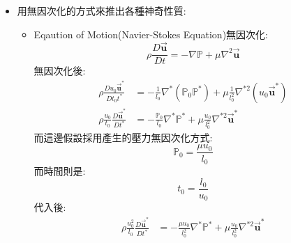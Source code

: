 \documentclass[../main.tex]{subfiles}
\begin{document}
\begin{itemize}
\begin{itemize}
    \begin{equation}
      \nabla^\ast = l_0 \cdot \nabla, \quad \nabla^{\ast 2} = l_0^2 \cdot \nabla^2
    \end{equation}
    會變成用乘的而不是除的，因為$\nabla^\ast$所代表的每個單位向量都被除了$l_0$\\
    可以想成你是對$\frac{\nabla}{l_0}$無因次化，所以你在找的$\nabla_0$是$\frac{1}{l_0}$
    \item 衍生，對$D/Dt$的無因次化\\
    P.S. $D$跟帶有單位的$\nabla$不一樣，只是個微分符號而已哦!
    \begin{equation}
      \frac{D}{D t^\ast} = \frac{D}{D\left(\frac{t}{t_0}\right)} = t_0 \cdot \frac{D}{Dt} = \left(\frac{l_0}{u_0}\right) \cdot \frac{D}{Dt}
    \end{equation}
  \end{itemize}
  \item 用無因次化的方式來推出各種神奇性質:
  \begin{itemize}
    \item Eqaution of Motion(Navier-Stokes Equation)無因次化:
    \begin{equation}
      \rho \frac{D\vec {\bm u}}{Dt} = -\nabla \mathbb P + \mu \nabla^2 \vec {\bm u}
    \end{equation}
    無因次化後:
    \begin{align}
      \rho \frac{D u_0 \vec{ \bm u}^\ast}{D  t_0 t^\ast} &= 
      -\frac{1}{l_0}\nabla^\ast \left(\mathbb P_0 \mathbb P^\ast\right) 
      + \mu \frac{1}{l_0^2} \nabla^{\ast 2} \left(u_0 \vec {\bm u}^\ast\right) \nonumber\\
      \rho \frac{u_0}{t_0} \frac{D \vec {\bm u}^\ast}{D t^\ast} &= 
      -\frac{\mathbb P_0}{l_0} \nabla^\ast \mathbb P^\ast 
      + \mu \frac{u_0}{l_0^2} \nabla^{\ast 2} \vec {\bm u}^\ast
    \end{align}
    而這邊假設採用產生的壓力無因次化方式:
    \begin{equation}
      \mathbb P_0 = \frac{\mu u_0}{l_0}
    \end{equation}
    而時間則是:
    \begin{equation}
      t_0 = \frac{l_0}{u_0}
    \end{equation}
    代入後:
    \begin{align}
      \rho \frac{u_0^2}{l_0} \frac{D \vec {\bm u}^\ast}{D t^\ast} &= 
      -\frac{\mu u_0}{l_0^2} \nabla^\ast \mathbb P^\ast 
      + \mu \frac{u_0}{l_0^2} \nabla^{\ast 2} \vec {\bm u}^\ast \nonumber\\

\end{align}
\end{itemize}
\end{itemize}
\end{document}
